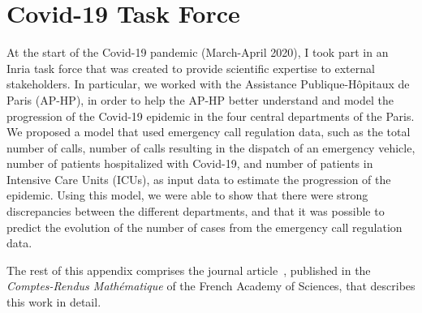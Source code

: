 \chapter{Covid-19 Task Force}
\label{chap:covid}

At the start of the Covid-19 pandemic (March-April 2020), I took part in an Inria task force that was created to provide scientific expertise to external stakeholders.
In particular, we worked with the Assistance Publique-Hôpitaux de Paris (AP-HP), in order to help the AP-HP better understand and model the progression of the Covid-19 epidemic in the four central departments of the Paris.
We proposed a model that used emergency call regulation data, such as the total number of calls, number of calls resulting in the dispatch of an emergency vehicle, number of patients hospitalized with Covid-19, and number of patients in Intensive Care Units (ICUs), as input data to estimate the progression of the epidemic.
Using this model, we were able to show that there were strong discrepancies between the different departments, and that it was possible to predict the evolution of the number of cases from the emergency call regulation data.

The rest of this appendix comprises the journal article~\citep{gaubert2020}, published in the \emph{Comptes-Rendus Mathématique} of the French Academy of Sciences, that describes this work in detail.


